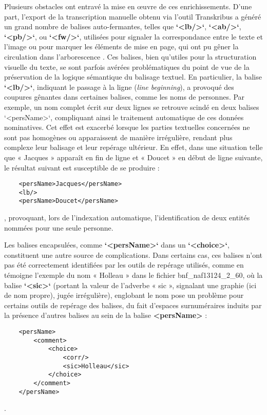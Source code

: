 Plusieurs obstacles ont entravé la mise en œuvre de ces enrichissements. 
D’une part, l’export \tei de la transcription manuelle obtenu via l’outil Transkribus a généré un grand nombre de balises auto-fermantes, telles que \textbf{`<lb/>`}, \textbf{`<ab/>`}, \textbf{`<pb/>`}, ou \textbf{`<fw/>`}, utilisées pour signaler la correspondance entre le texte et l’image ou pour marquer les éléments de mise en page, qui ont pu gêner la circulation dans l’arborescence \xml. Ces balises, bien qu’utiles pour la structuration visuelle du texte, se sont parfois avérées problématiques du point de vue de la préservation de la logique sémantique du balisage textuel. 
En particulier, la balise \textbf{`<lb/>`}, indiquant le passage à la ligne (\textit{line beginning}), a provoqué des coupures gênantes dans certaines balises, comme les noms de personnes. Par exemple, un nom complet écrit sur deux lignes se retrouve scindé en deux balises `<persName>`, compliquant ainsi le traitement automatique de ces données nominatives. Cet effet est exacerbé lorsque les parties textuelles concernées ne sont pas homogènes ou apparaissent de manière irrégulière, rendant plus complexe leur balisage et leur repérage ultérieur. En effet, dans une situation telle que « Jacques » apparaît en fin de ligne et « Doucet » en début de ligne suivante, le résultat suivant est susceptible de se produire : 
\begin{verbatim}
    <persName>Jacques</persName>
    <lb/>
    <persName>Doucet</persName>
\end{verbatim}, provoquant, lors de l’indexation automatique, l’identification de deux entités nommées pour une seule personne. 

Les balises encapsulées, comme \textbf{`<persName>`} dans un \textbf{`<choice>`}, constituent une autre source de complications. Dans certains cas, ces balises n’ont pas été correctement identifiées par les outils de repérage utilisés, comme en témoigne l’exemple du nom « Holleau » dans le fichier bnf\_naf13124\_2\_60, où la balise \textbf{`<sic>`} (portant la valeur de l’adverbe « sic », signalant une graphie (ici de nom propre), jugée irrégulière), englobant le nom pose un problème pour certains outils de repérage des balises, du fait d’espaces surnuméraires induits par la présence d’autres balises au sein de la balise \textbf{<persName>} :
    \begin{verbatim} 
    <persName>
        <comment>
            <choice>
                <corr/>
                <sic>Holleau</sic>
            </choice>
        </comment>
    </persName>
    \end{verbatim}.
\newline
{}

